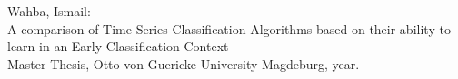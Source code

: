 \documentclass{report}
\begin{document}

\small
\vspace*{\fill}
{\raggedright
Wahba, Ismail:\\
A comparison of Time Series Classification Algorithms based on their
ability to learn in an Early Classification Context \\ Master Thesis, Otto-von-Guericke-University Magdeburg, year. 
}

\thispagestyle{empty}
\null\newpage

\null\newpage

\null\newpage


\end{document}

